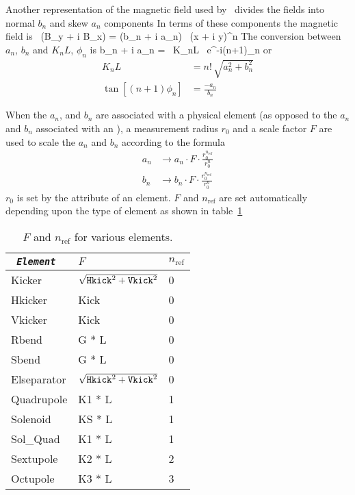 Another representation of the magnetic field used by \bmad\ divides
the fields into normal $b_n$ and skew $a_n$ components In terms of
these components the magnetic field is
\Begineq
   \, (B_y + i B_x) = (b_n + i a_n) \, (x + i y)^n
\Endeq
The conversion between $a_n$, $b_n$ and $K_nL$, $\phi_n$ is
\Begineq
  b_n + i a_n =  \, K_nL \, e^{-i(n+1)\phi_n}
\Endeq
or
\begin{align}
  K_n L &= n! \, \sqrt{a_n^2 + b_n^2} \\
  \tan[(n+1) \phi_n] &= \frac{-a_n}{b_n}
\end{align}

When the $a_n$, and $b_n$ are associated with a physical element (as
opposed to the $a_n$ and $b_n$ associated with an ),
a measurement radius $r_0$ and a scale factor
$F$ are used to scale the $a_n$ and $b_n$ according to the formula
\begin{align}
  a_n &\rightarrow 
        a_n \cdot F \cdot \frac{r_0^{n_\text{ref}}}{r_0^n} \nonumber \\
  b_n &\rightarrow 
        b_n \cdot F \cdot \frac{r_0^{n_\text{ref}}}{r_0^n}
\end{align}
$r_0$ is set by the  attribute of an element. $F$ and $n_\text{ref}$ 
are set automatically depending upon the type of element as shown in 
table~\ref{t:ab}

\begin{table}[h]
\centering
\begin{tabular}{|l|l|l|} \hline
\tt
  {\em Element} & $F$                              & $n_\text{ref}$ \\ \hline
  Kicker        & $\sqrt{{\tt Hkick}^2 + {\tt Vkick}^2}$ & 0 \\
  Hkicker       & Kick                                   & 0 \\
  Vkicker       & Kick                                   & 0 \\
  Rbend         & G * L                                  & 0 \\
  Sbend         & G * L                                  & 0 \\
  Elseparator   & $\sqrt{{\tt Hkick}^2 + {\tt Vkick}^2}$ & 0 \\
  Quadrupole    & K1 * L                                 & 1 \\
  Solenoid      & KS * L                                 & 1 \\
  Sol\_Quad     & K1 * L                                 & 1 \\
  Sextupole     & K2 * L                                 & 2 \\
  Octupole      & K3 * L                                 & 3 \\ \hline
\end{tabular}
\caption{$F$ and $n_\text{ref}$ for various elements.}
\label{t:ab}
\end{table}

